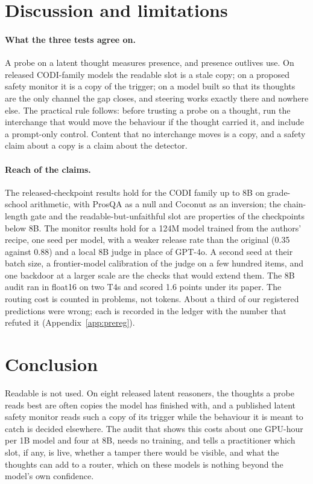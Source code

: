 \documentclass{article}
\begin{document}
\section{Discussion and limitations}

\paragraph{What the three tests agree on.} A probe on a latent thought measures presence, and presence outlives use. On released CODI-family models the readable slot is a stale copy; on a proposed safety monitor it is a copy of the trigger; on a model built so that its thoughts are the only channel the gap closes, and steering works exactly there and nowhere else. The practical rule follows: before trusting a probe on a thought, run the interchange that would move the behaviour if the thought carried it, and include a prompt-only control. Content that no interchange moves is a copy, and a safety claim about a copy is a claim about the detector.

\paragraph{Reach of the claims.} The released-checkpoint results hold for the CODI family up to 8B on grade-school arithmetic, with ProsQA as a null and Coconut as an inversion; the chain-length gate and the readable-but-unfaithful slot are properties of the checkpoints below 8B. The monitor results hold for a 124M model trained from the authors' recipe, one seed per model, with a weaker release rate than the original (0.35 against 0.88) and a local 8B judge in place of GPT-4o. A second seed at their batch size, a frontier-model calibration of the judge on a few hundred items, and one backdoor at a larger scale are the checks that would extend them. The 8B audit ran in float16 on two T4s and scored 1.6 points under its paper. The routing cost is counted in problems, not tokens. About a third of our registered predictions were wrong; each is recorded in the ledger with the number that refuted it (Appendix~\ref{app:prereg}).

\section{Conclusion}

Readable is not used. On eight released latent reasoners, the thoughts a probe reads best are often copies the model has finished with, and a published latent safety monitor reads such a copy of its trigger while the behaviour it is meant to catch is decided elsewhere. The audit that shows this costs about one GPU-hour per 1B model and four at 8B, needs no training, and tells a practitioner which slot, if any, is live, whether a tamper there would be visible, and what the thoughts can add to a router, which on these models is nothing beyond the model's own confidence.
\end{document}

